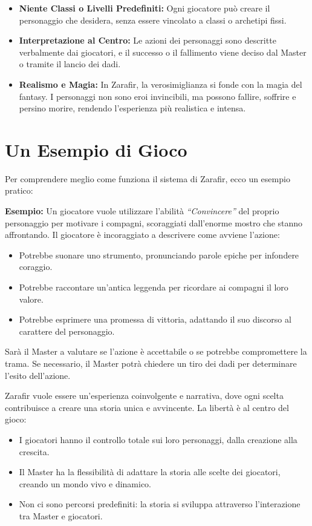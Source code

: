 \documentclass[../manuale_main.tex]{subfiles}
\begin{document}
\begin{itemize}
    \item \textbf{Niente Classi o Livelli Predefiniti:} Ogni giocatore può creare il personaggio che desidera, senza essere vincolato a classi o archetipi fissi.
    
    \item \textbf{Interpretazione al Centro:} Le azioni dei personaggi sono descritte verbalmente dai giocatori, e il successo o il fallimento viene deciso dal Master o tramite il lancio dei dadi.
    
    \item \textbf{Realismo e Magia:} In Zarafir, la verosimiglianza si fonde con la magia del fantasy. I personaggi non sono eroi invincibili, ma possono fallire, soffrire e persino morire, rendendo l’esperienza più realistica e intensa.
\end{itemize}

\vspace{0.3cm}

\section{Un Esempio di Gioco}
Per comprendere meglio come funziona il sistema di Zarafir, ecco un esempio pratico:

\vspace{0.2cm}

\textbf{Esempio:} Un giocatore vuole utilizzare l'abilità \textit{“Convincere”} del proprio personaggio per motivare i compagni, scoraggiati dall’enorme mostro che stanno affrontando. Il giocatore è incoraggiato a descrivere come avviene l'azione:

\begin{itemize}
    \item Potrebbe suonare uno strumento, pronunciando parole epiche per infondere coraggio.
    \item Potrebbe raccontare un'antica leggenda per ricordare ai compagni il loro valore.
    \item Potrebbe esprimere una promessa di vittoria, adattando il suo discorso al carattere del personaggio.
\end{itemize}

Sarà il Master a valutare se l'azione è accettabile o se potrebbe compromettere la trama. Se necessario, il Master potrà chiedere un tiro dei dadi per determinare l'esito dell'azione. 

Zarafir vuole essere un’esperienza coinvolgente e narrativa, dove ogni scelta contribuisce a creare una storia unica e avvincente. La libertà è al centro del gioco:

\begin{itemize}
    \item I giocatori hanno il controllo totale sui loro personaggi, dalla creazione alla crescita.
    \item Il Master ha la flessibilità di adattare la storia alle scelte dei giocatori, creando un mondo vivo e dinamico.
    \item Non ci sono percorsi predefiniti: la storia si sviluppa attraverso l'interazione tra Master e giocatori.
\end{itemize}
\end{document}
